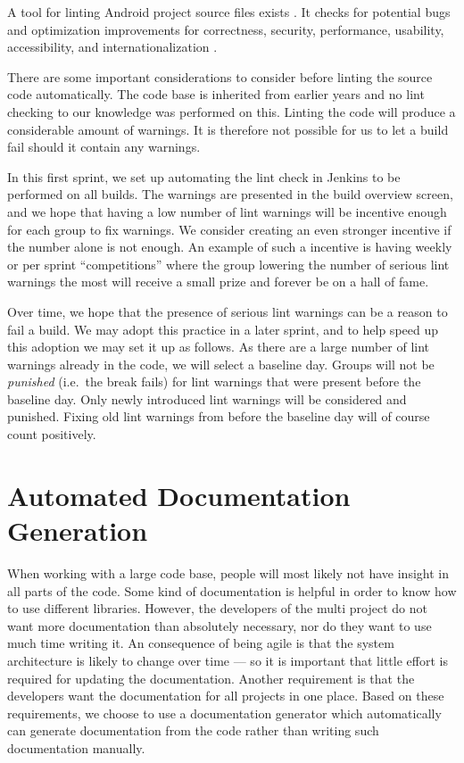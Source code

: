 A tool for linting Android project source files exists . It checks for potential bugs and optimization improvements for correctness, security, performance, usability, accessibility, and internationalization \parencite{AndroidLint}.

There are some important considerations to consider before linting the source code automatically. The code base is inherited from earlier years and no lint checking to our knowledge was performed on this. Linting the code will produce a considerable amount of warnings. It is therefore not possible for us to let a build fail should it contain any warnings.

In this first sprint, we set up automating the lint check in Jenkins to be performed on all builds. The warnings are presented in the build overview screen, and we hope that having a low number of lint warnings will be incentive enough for each group to fix warnings. We consider creating an even stronger incentive if the number alone is not enough. An example of such a incentive is having weekly or per sprint ``competitions'' where the group lowering the number of serious lint warnings the most will receive a small prize and forever be on a hall of fame.

Over time, we hope that the presence of serious lint warnings can be a reason to fail a build. We may adopt this practice in a later sprint, and to help speed up this adoption we may set it up as follows. As there are a large number of lint warnings already in the code, we will select a baseline day. Groups will not be \emph{punished} (i.e.\ the break fails) for lint warnings that were present before the baseline day. Only newly introduced lint warnings will be considered and punished. Fixing old lint warnings from before the baseline day will of course count positively. %



\section{Automated Documentation Generation}\label{sec:automated_documentation_gen}
When working with a large code base, people will most likely not have insight in all parts of the code. Some kind of documentation is helpful in order to know how to use different libraries. However, the developers of the multi project do not want more documentation than absolutely necessary, nor do they want to use much time writing it. An consequence of being agile is that the system architecture is likely to change over time --- so it is important that little effort is required for updating the documentation. Another requirement is that the developers want the documentation for all projects in one place. Based on these requirements, we choose to use a documentation generator which automatically can generate documentation from the code rather than writing such documentation manually.


